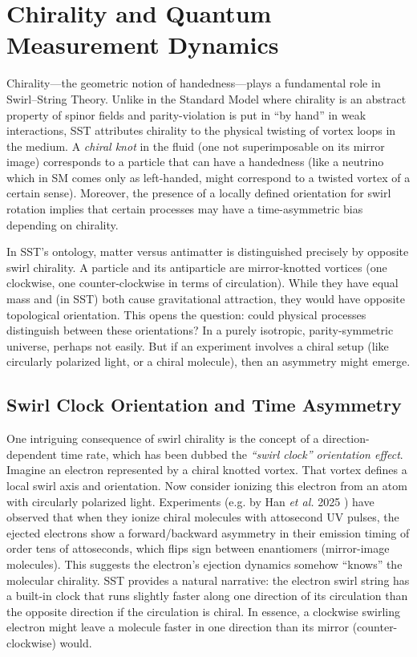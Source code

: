 \documentclass[10pt,reprint,aps,onecolumn,nofootinbib]{revtex4-2}
\begin{document}
\section{Chirality and Quantum Measurement Dynamics}

Chirality—the geometric notion of handedness—plays a fundamental role in Swirl–String Theory. Unlike in the Standard Model where chirality is an abstract property of spinor fields and parity-violation is put in ``by hand'' in weak interactions, SST attributes chirality to the physical twisting of vortex loops in the medium. A \emph{chiral knot} in the fluid (one not superimposable on its mirror image) corresponds to a particle that can have a handedness (like a neutrino which in SM comes only as left-handed, might correspond to a twisted vortex of a certain sense). Moreover, the presence of a locally defined orientation for swirl rotation implies that certain processes may have a time-asymmetric bias depending on chirality.


In SST’s ontology, matter versus antimatter is distinguished precisely by opposite swirl chirality. A particle and its antiparticle are mirror-knotted vortices (one clockwise, one counter-clockwise in terms of circulation). While they have equal mass and (in SST) both cause gravitational attraction, they would have opposite topological orientation. This opens the question: could physical processes distinguish between these orientations? In a purely isotropic, parity-symmetric universe, perhaps not easily. But if an experiment involves a chiral setup (like circularly polarized light, or a chiral molecule), then an asymmetry might emerge.


\subsection{Swirl Clock Orientation and Time Asymmetry}

One intriguing consequence of swirl chirality is the concept of a direction-dependent time rate, which has been dubbed the \emph{``swirl clock'' orientation effect}. Imagine an electron represented by a chiral knotted vortex. That vortex defines a local swirl axis and orientation. Now consider ionizing this electron from an atom with circularly polarized light. Experiments (e.g. by Han \textit{et al.} 2025 \cite{Han2025}) have observed that when they ionize chiral molecules with attosecond UV pulses, the ejected electrons show a forward/backward asymmetry in their emission timing of order tens of attoseconds, which flips sign between enantiomers (mirror-image molecules). This suggests the electron’s ejection dynamics somehow “knows” the molecular chirality. SST provides a natural narrative: the electron swirl string has a built-in clock that runs slightly faster along one direction of its circulation than the opposite direction if the circulation is chiral. In essence, a clockwise swirling electron might leave a molecule faster in one direction than its mirror (counter-clockwise) would.
\end{document}
